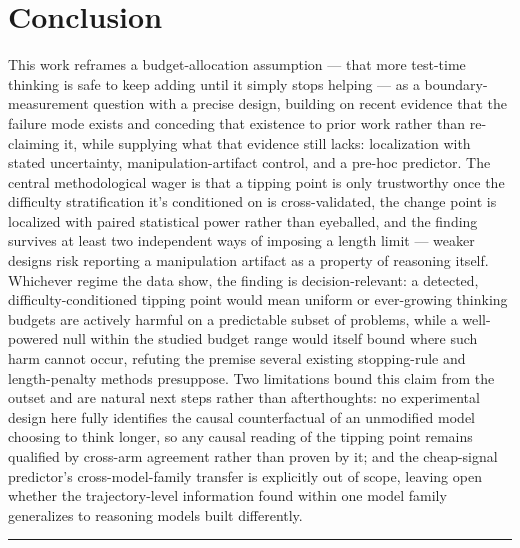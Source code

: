 \documentclass[11pt]{article}
\begin{document}
\section{Conclusion}

This work reframes a budget-allocation assumption --- that more test-time thinking is safe to keep adding until it simply stops helping --- as a boundary-measurement question with a precise design, building on recent evidence that the failure mode exists \cite{WhenMoreThinkingHurts2604,InverseScalingTTC2507} and conceding that existence to prior work rather than re-claiming it, while supplying what that evidence still lacks: localization with stated uncertainty, manipulation-artifact control, and a pre-hoc predictor. The central methodological wager is that a tipping point is only trustworthy once the difficulty stratification it's conditioned on is cross-validated, the change point is localized with paired statistical power rather than eyeballed, and the finding survives at least two independent ways of imposing a length limit --- weaker designs risk reporting a manipulation artifact as a property of reasoning itself. Whichever regime the data show, the finding is decision-relevant: a detected, difficulty-conditioned tipping point would mean uniform or ever-growing thinking budgets are actively harmful on a predictable subset of problems, while a well-powered null within the studied budget range would itself bound where such harm cannot occur, refuting the premise several existing stopping-rule and length-penalty methods presuppose. Two limitations bound this claim from the outset and are natural next steps rather than afterthoughts: no experimental design here fully identifies the causal counterfactual of an unmodified model choosing to think longer, so any causal reading of the tipping point remains qualified by cross-arm agreement rather than proven by it; and the cheap-signal predictor's cross-model-family transfer is explicitly out of scope, leaving open whether the trajectory-level information found within one model family generalizes to reasoning models built differently.

\vspace{1em}
\hrule
\vspace{1em}
\end{document}
